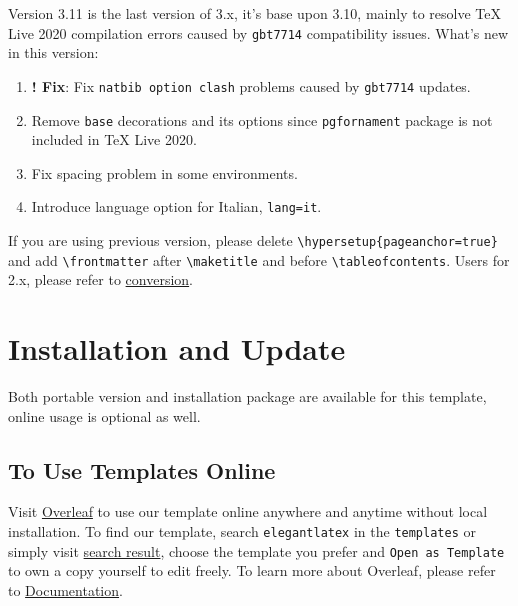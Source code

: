 \documentclass[11pt,fancy,twocol]{elegantbook}
\begin{document}
Version 3.11 is the last version of 3.x, it's base upon 3.10, mainly to resolve \TeX{} Live 2020 compilation errors caused by \lstinline{gbt7714} compatibility issues. What\rq s new in this version:

\begin{enumerate}
  \item \textbf{! Fix}: Fix \lstinline{natbib option clash} problems caused by \lstinline{gbt7714} updates.
  \item Remove \lstinline{base} decorations and its options since \lstinline{pgfornament} package is not included in \TeX{} Live 2020.
  \item Fix spacing problem in some environments.
  \item Introduce language option for Italian, \lstinline{lang=it}.
\end{enumerate}


\begin{note}
  If you are using previous version, please delete \lstinline|\hypersetup{pageanchor=true}| and add \lstinline{\frontmatter} after \lstinline{\maketitle} and before \lstinline{\tableofcontents}. Users for 2.x, please refer to \href{https://github.com/ElegantLaTeX/ElegantBook/wiki/convert}{conversion}.
\end{note}

\section{Installation and Update}
Both portable version and installation package are available for this template, online usage is optional as well.

\subsection{To Use Templates Online}
Visit \href{https://www.overleaf.com/}{Overleaf} to use our template online anywhere and anytime without local installation. To find our template, search \lstinline{elegantlatex} in the \lstinline{templates} or simply visit \href{https://www.overleaf.com/latex/templates?addsearch=elegantlatex}{search result}, choose the template you prefer and \lstinline{Open as Template} to own a copy yourself to edit freely. To learn more about Overleaf, please refer to \href{https://www.overleaf.com/learn}{Documentation}.
\end{document}
